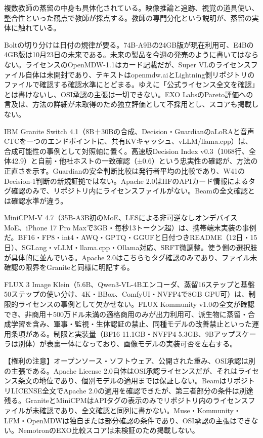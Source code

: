 \documentclass[lualatex,a4paper,10pt]{jlreq}
\begin{document}
複数教師の蒸留の中身も具体化されている。映像推論と追跡、視覚の道具使い、整合性といった観点で教師が採点する。教師の専門分化という説明が、蒸留の実体に触れている。
\cite{B20,B21,B22}


Boltの切り分けは日付の規律が要る。74B-A9Bの24GB版が現在利用可、E4Bの4GB版は10月23日の未来である。未来の製品を今週の発売のように書いてはならない。ライセンスのOpenMDW-1.1はカード記載だが、Super VLのライセンスファイル自体は未開封であり、テキストはopenmdw.aiとLightning側リポジトリのファイルで確認する確認水準にとどまる。ゆえに「公式ライセンス全文を確認」とは書けないし、OSI承認の主張は一切できない。EXO LabsのPareto評価への言及は、方法の詳細が未取得のため独立評価として不採用とし、スコアも掲載しない。
\cite{B20,B21,B22}


IBM Granite Switch 4.1（8B＋30Bの合成、Decision・GuardianのaLoRAと音声CTCを一つのエンドポイントに、共有KVキャッシュ、vLLM/llama.cpp）は、合成可能性の事例として対照軸に置く。高速版Decision Index v0.3（1068行、全体42.9）と自前・他社ホストの一致確認（±0.6）という忠実性の確認が、方法の正直さを示す。Guardianの安全判断比較は発行者平均の比較であり、W41のDecision-1判断の新規証拠ではない。Apache 2.0はHFのAPIカード情報によるタグ確認のみで、リポジトリ内にライセンスファイルがない。Beamの全文確認とは確認水準が違う。
\cite{B23,B24,B25}


MiniCPM-V 4.7（35B-A3B初のMoE、LESによる非可逆なしオンデバイスMoE、iPhone 17 Pro Maxで3GB・毎秒13トークン超）は、携帯端末実装の事例だ。BF16・FP8・int4・AWQ・GPTQ・GGUFと日付つきREADME（12日・15日）、SGLang・vLLM・llama.cpp・Ollama対応、SRFT微調整。使う側の選択肢が具体的に並んでいる。Apache 2.0はこちらもタグ確認のみであり、ファイル未確認の限界をGraniteと同様に明記する。
\cite{B26,B27}


FLUX 3 Image Klein（5.6B、Qwen3-VL-4Bエンコーダ、蒸留16ステップと基盤50ステップの使い分け、4K・BBox、ComfyUI・NVFP4で8GB GPU可）は、制限的ライセンスの事例として欠かせない。FLUX Kommunity v1.0の全文が確認でき、非商用＋500万ドル未満の適格商用のみが出力利用可、派生物に蒸留・合成学習を含み、軍事・監視・生体認証の禁止、同種モデルの改善禁止といった運用条項がある。制限と実装量（BF16 11.1GB・NVFP4 5.3GB、9Bアップスケーラは別体）が表裏一体になっており、画像モデルの実装可否を左右する。
\cite{B28,B29,B30}


\begin{tcolorbox}[colback=SurveySoft,colframe=SurveyRule,arc=1mm,boxrule=0.4pt,left=2mm,right=2mm]
【権利の注意】オープンソース・ソフトウェア、公開された重み、OSI承認は別の主張である。Apache License 2.0自体はOSI承認ライセンスだが、それはライセンス条文の地位であり、個別モデルの適用までは保証しない。BeamはリポジトリLICENSE全文でApache 2.0の適用を確認できたが、第三者部分の条件は別途残る。GraniteとMiniCPMはAPIタグの表示のみでリポジトリ内のライセンスファイルが未確認であり、全文確認と同列に書かない。Muse・Kommunity・LFM・OpenMDWは独自または部分確認の条件であり、OSI承認の主張はできない。NemotronのEXO比較スコアは未検証のため掲載しない。
\end{tcolorbox}
\cite{B20,B21,B28,B23,B26,B29,B30,B24,B25,B13,B27,B16,B17,B18,B19,B14,B22,B15}
\end{document}
